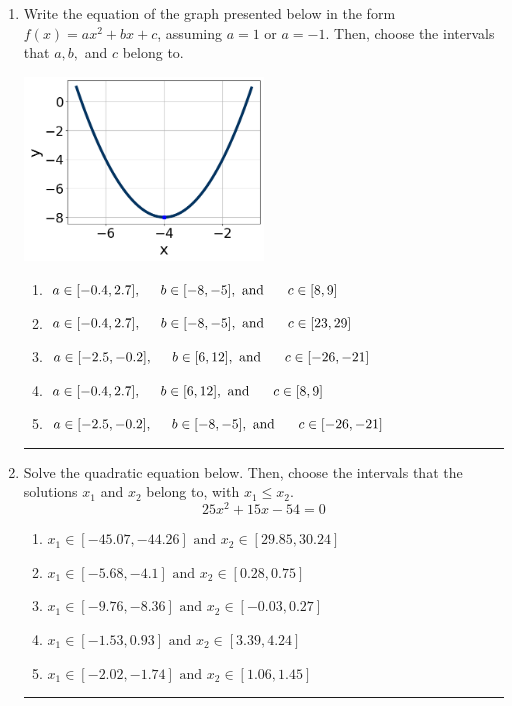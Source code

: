 \documentclass[14pt]{extbook}
\newcommand{\litem}[1]{\item#1\hspace*{-1cm}\rule{\textwidth}{0.4pt}}
\begin{document}
\begin{enumerate}
{\begin{enumerate}[label=\Alph*.]
\end{enumerate} }
\litem{
Write the equation of the graph presented below in the form $f(x)=ax^2+bx+c$, assuming  $a=1$ or $a=-1$. Then, choose the intervals that $a, b,$ and $c$ belong to.
\begin{center}
    \includegraphics[width=0.5\textwidth]{../Figures/quadraticGraphToEquationC.png}
\end{center}
\begin{enumerate}[label=\Alph*.]
\item \( a \in [-0.4, 2.7], \hspace*{5mm} b \in [-8, -5], \text{ and } \hspace*{5mm} c \in [8, 9] \)
\item \( a \in [-0.4, 2.7], \hspace*{5mm} b \in [-8, -5], \text{ and } \hspace*{5mm} c \in [23, 29] \)
\item \( a \in [-2.5, -0.2], \hspace*{5mm} b \in [6, 12], \text{ and } \hspace*{5mm} c \in [-26, -21] \)
\item \( a \in [-0.4, 2.7], \hspace*{5mm} b \in [6, 12], \text{ and } \hspace*{5mm} c \in [8, 9] \)
\item \( a \in [-2.5, -0.2], \hspace*{5mm} b \in [-8, -5], \text{ and } \hspace*{5mm} c \in [-26, -21] \)

\end{enumerate} }
\litem{
Solve the quadratic equation below. Then, choose the intervals that the solutions $x_1$ and $x_2$ belong to, with $x_1 \leq x_2$.\[ 25x^{2} +15 x -54 = 0 \]\begin{enumerate}[label=\Alph*.]
\item \( x_1 \in [-45.07, -44.26] \text{ and } x_2 \in [29.85, 30.24] \)
\item \( x_1 \in [-5.68, -4.1] \text{ and } x_2 \in [0.28, 0.75] \)
\item \( x_1 \in [-9.76, -8.36] \text{ and } x_2 \in [-0.03, 0.27] \)
\item \( x_1 \in [-1.53, 0.93] \text{ and } x_2 \in [3.39, 4.24] \)
\item \( x_1 \in [-2.02, -1.74] \text{ and } x_2 \in [1.06, 1.45] \)


\end{enumerate}}
\end{enumerate}
\end{document}
